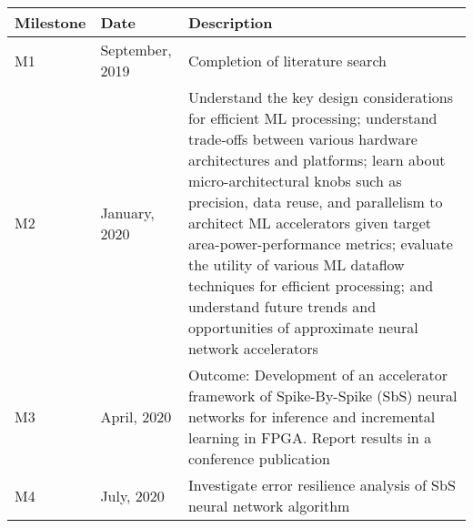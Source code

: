 	\begin{longtable}{|l|l|m{9cm}|}
		\hline
		\rowcolor[HTML]{C0C0C0} 
		\textbf{Milestone} & \textbf{Date}   & \textbf{Description}                                                                                                                                                                                                                                                                                                                                                                                                                                                                \\ \hline
		M1                 & September, 2019 & Completion of literature search                                                                                                                                                                                                                                                                                                                                                                                                                                                     \\ \hline
		M2                 & January, 2020   & Understand the key design considerations for efficient ML processing; understand trade-offs between various hardware architectures and platforms; learn about micro-architectural knobs such as precision, data reuse, and parallelism to architect ML accelerators given target area-power-performance metrics; evaluate the utility of various ML dataflow techniques for efficient processing; and understand future trends and opportunities of approximate neural network accelerators \\ \hline
		M3                 & April, 2020     & Outcome: Development of an accelerator framework of Spike-By-Spike (SbS) neural networks for inference and incremental learning in FPGA. Report results in a conference publication \cite{nevarez2020accelerator}                                                                                                                                                                                                                                                                                                                                                                     \\ \hline
		M4                 & July, 2020      & Investigate error resilience analysis of SbS neural network algorithm                                                                                                                                                                                                                                                                           \\ \hline

\end{longtable}
